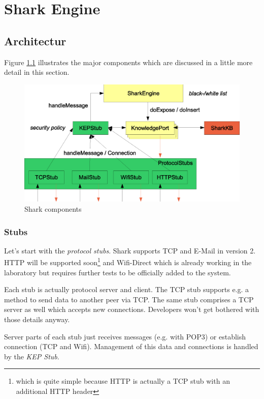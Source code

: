 \chapter{Shark Engine}
\label{sec:sharkengine}

\section{Architectur}
Figure \ref{fig:sharkComponents} illustrates the major components which are discussed in a little more detail in this section.

\begin{figure}[t]
\centering
\includegraphics[width=1.00\textwidth]{sharkComponents.eps}
\caption{Shark components}
\label{fig:sharkComponents}
\end{figure}

\subsection{Stubs}
Let's start with the {\it protocol stubs}. Shark supports TCP and E-Mail in version 2. HTTP will be supported soon\footnote{which is quite simple because HTTP is actually a TCP stub with an additional HTTP header} and Wifi-Direct which is already working in the laboratory but requires further tests to be officially added to the system.

Each stub is actually protocol server and client. The TCP stub supports e.g. a method to send data to another peer via TCP. The same stub comprises a TCP server as well which accepts new connections. Developers won't get bothered with those details anyway.

Server parts of each stub just receives messages (e.g. with POP3) or establish connection (TCP and Wifi). Management of this data and connections is handled by the {\it KEP Stub}.

